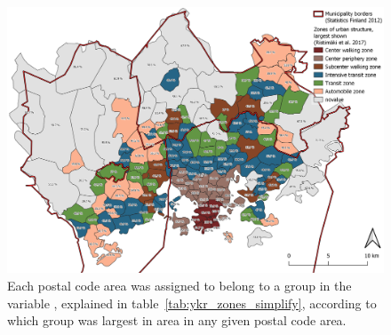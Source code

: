 \begin{figure}[H]%
    \centering
    \includegraphics[width=\textwidth]{images/thesis_postalvis_ykrzone.png}
    \caption[Calculated zones of urban structure in the research area]{Each postal code area was assigned to belong to a group in the variable , explained in table~\ref{tab:ykr_zones_simplify}, according to which group was largest in area in any given postal code area.}%
    \label{fig:postalvis_ykrzone}%
\end{figure}

